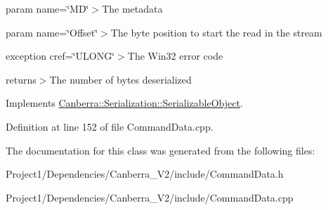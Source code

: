 param name=\char`\"{}\+M\+D\char`\"{}$>$The metadata

param name=\char`\"{}\+Offset\char`\"{}$>$The byte position to start the read in the stream

exception cref=\char`\"{}\+U\+L\+O\+N\+G\char`\"{}$>$The Win32 error code

returns$>$The number of bytes deserialized

Implements \hyperlink{class_canberra_1_1_serialization_1_1_serializable_object}{Canberra\+::\+Serialization\+::\+Serializable\+Object}.



Definition at line 152 of file Command\+Data.\+cpp.



The documentation for this class was generated from the following files\+:\begin{DoxyCompactItemize}
\item 
Project1/\+Dependencies/\+Canberra\+\_\+\+V2/include/Command\+Data.\+h\item 
Project1/\+Dependencies/\+Canberra\+\_\+\+V2/include/Command\+Data.\+cpp\end{DoxyCompactItemize}
